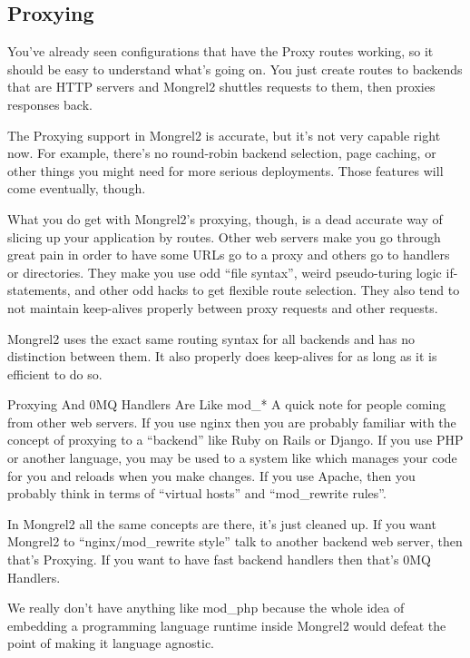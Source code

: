 \subsection{Proxying}

You've already seen configurations that have the Proxy routes working, so it should
be easy to understand what's going on.  You just create routes to backends that are
HTTP servers and Mongrel2 shuttles requests to them, then proxies responses back.

The Proxying support in Mongrel2 is accurate, but it's not very capable right now.  For
example, there's no round-robin backend selection, page caching, or other things you
might need for more serious deployments.  Those features will come eventually, though.

What you do get with Mongrel2's proxying, though, is a dead accurate way of slicing up
your application by routes.  Other web servers make you go through great pain in order
to have some URLs go to a proxy and others go to handlers or directories.  They make you
use odd ``file syntax'', weird pseudo-turing logic if-statements, and other odd hacks
to get flexible route selection.  They also tend to not maintain keep-alives properly
between proxy requests and other requests.

Mongrel2 uses the exact same routing syntax for all backends and has no distinction between
them.  It also properly does keep-alives for as long as it is efficient to do so.

\begin{aside}{Proxying And 0MQ Handlers Are Like mod\_*}
A quick note for people coming from other web servers.  If you use nginx then you are probably
familiar with the concept of proxying to a ``backend'' like Ruby on Rails or Django.
If you use PHP or another language, you may be used to a system like  which 
manages your code for you and reloads when you make changes.
If you use Apache, then you probably think in terms of ``virtual hosts'' and ``mod\_rewrite rules''.

In Mongrel2 all the same concepts are there, it's just cleaned up.  If you want Mongrel2
to ``nginx/mod\_rewrite style'' talk to another backend web server, then that's Proxying.
If you want to have fast backend handlers then that's 0MQ Handlers.

We really don't have anything like mod\_php because the whole idea of embedding a programming
language runtime inside Mongrel2 would defeat the point of making it language agnostic.
\end{aside}

